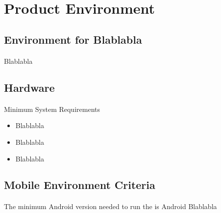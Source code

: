\newpage
\section{Product Environment}
\subsection{Environment for Blablabla}
\paragraph{}Blablabla

\subsection{Hardware}
\paragraph{}Minimum System Requirements	 
\begin{itemize}
\item Blablabla
\item Blablabla
\item Blablabla
\end{itemize}
	 
\subsection{Mobile Environment Criteria}
\paragraph{}The minimum Android version needed to run the \app is Android Blablabla
